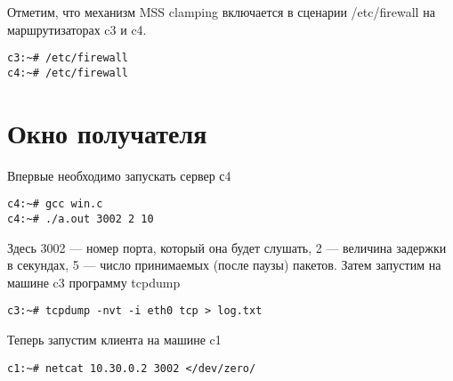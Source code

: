 \documentclass[a4paper,12pt]{article}
\begin{document}
Отметим, что механизм MSS clamping включается в сценарии /etc/firewall на маршрутизаторах c3 и c4.
\begin{lstlisting}
c3:~# /etc/firewall
с4:~# /etc/firewall
\end{lstlisting}

\section{Окно получателя}

Впервые необходимо запускать сервер с4
\begin{lstlisting}
c4:~# gcc win.c
c4:~# ./a.out 3002 2 10
\end{lstlisting}

Здесь 3002 — номер порта, который она будет слушать, 2 — величина задержки в секундах, 5 — число принимаемых (после паузы) пакетов.
Затем запустим на машине c3 программу tcpdump
\begin{lstlisting}
c3:~# tcpdump -nvt -i eth0 tcp > log.txt
\end{lstlisting}

Теперь запустим клиента на машине c1
\begin{lstlisting}
c1:~# netcat 10.30.0.2 3002 </dev/zero/
\end{lstlisting}
\end{document}
